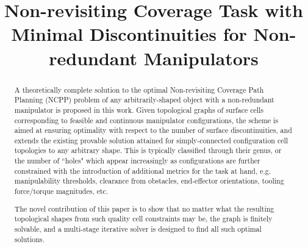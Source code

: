 \documentclass[conference]{IEEEtran}
\begin{document}
\title{Non-revisiting Coverage Task with Minimal Discontinuities for Non-redundant Manipulators}


%

\maketitle

\begin{abstract}
A theoretically complete solution to the optimal Non-revisiting Coverage Path Planning (NCPP) problem of any arbitrarily-shaped 
object with a non-redundant manipulator is proposed in this work. 
Given topological graphs of surface cells corresponding to feasible and continuous manipulator configurations, 
the scheme is aimed at ensuring optimality with respect to the number of surface discontinuities,  
and extends the existing provable solution attained for simply-connected configuration cell topologies to any arbitrary shape. 
This is typically classified through their genus, or the number of ``holes" 
which appear increasingly as configurations are further constrained with the introduction of additional metrics for the
 task at hand, e.g. manipulability thresholds, clearance from obstacles, end-effector orientations, tooling force/torque magnitudes, etc.


The novel contribution of this paper is to show that no matter what the resulting topological shapes from such quality cell constraints may be, the graph is finitely solvable, and a multi-stage iterative solver is designed to find all such optimal solutions. 
\end{abstract}
\end{document}
